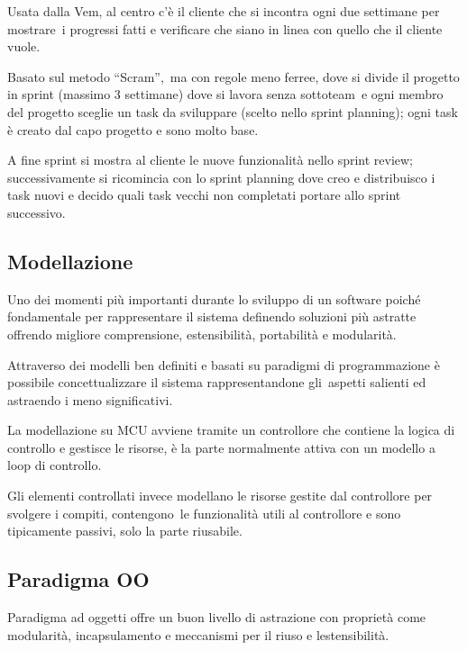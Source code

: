 \documentclass[
]{article}
\begin{document}
{Usata dalla Vem, al centro c'è il cliente che si incontra ogni due
settimane per }{mostrare}{~i progressi fatti e verificare che siano in
linea con quello che il cliente vuole.}

{Basato sul metodo }{``Scram'',}{~ma con regole meno ferree, dove si
divide il progetto in sprint (massimo 3 settimane) dove si lavora senza
}{sottoteam}{~e ogni membro del progetto sceglie un task da sviluppare
(scelto nello sprint planning); ogni task è creato dal capo progetto e
sono molto base.}

{A fine sprint si mostra al cliente le nuove funzionalità nello sprint
review; successivamente si ricomincia con lo sprint planning dove creo e
distribuisco i task nuovi e decido quali task vecchi non completati
portare allo sprint successivo.}

{}

\subsection{\texorpdfstring{{Modellazione}}{Modellazione}}\label{h.rep2q9kk4y3q}

{Uno dei momenti più importanti durante lo sviluppo di un software
poiché fondamentale per rappresentare il sistema definendo soluzioni più
astratte offrendo migliore comprensione, estensibilità, portabilità e
modularità.}

{Attraverso dei modelli ben definiti e basati su paradigmi di
programmazione è possibile concettualizzare il sistema
}{rappresentandone gli}{~aspetti salienti ed astraendo i meno
significativi.}

{}

{La modellazione su MCU avviene tramite un controllore che contiene la
logica di controllo e gestisce le risorse, è la parte normalmente attiva
con un modello a loop di controllo.}

{Gli elementi controllati invece modellano le risorse gestite dal
controllore per svolgere i }{compiti, contengono}{~le funzionalità utili
al controllore e sono tipicamente passivi, solo la parte riusabile.}

{}

\subsection{\texorpdfstring{{Paradigma
OO}}{Paradigma OO}}\label{h.o5iwkbhd1bvq}

{Paradigma ad oggetti offre un buon livello di astrazione con proprietà
come modularità, incapsulamento e meccanismi per il riuso e
l\textquotesingle estensibilità.}
\end{document}
